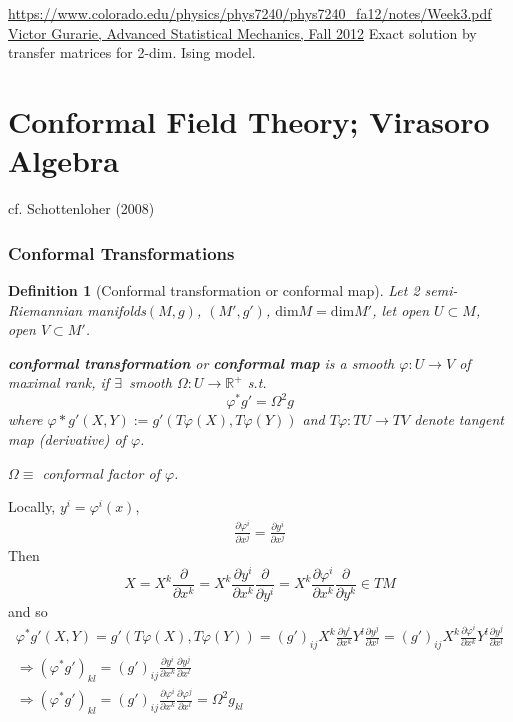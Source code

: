\documentclass[10pt]{amsart}
\newtheorem{definition}{Definition}
\begin{document}
\begin{multicols*}{2}
\url{https://www.colorado.edu/physics/phys7240/phys7240_fa12/notes/Week3.pdf}
\href{https://www.colorado.edu/physics/phys7240/phys7240_fa12/notes/Week3.pdf}{Victor Gurarie, Advanced Statistical Mechanics, Fall 2012}
Exact solution by transfer matrices for 2-dim. Ising model.  


\part{Conformal Field Theory; Virasoro Algebra}  

cf.  Schottenloher (2008)  \cite{Scho2008}

\section{Conformal Transformations}

\begin{definition}[Conformal transformation or conformal map]
Let 2 semi-Riemannian manifolds$(M,g)$, $(M',g')$, $\text{dim}M = \text{dim}M'$, let open $U\subset M$, open $V\subset M'$.  

\textbf{conformal transformation} or \textbf{conformal map} is a smooth $\varphi : U\to V$ of maximal rank, if $\exists \, $ smooth $\Omega : U\to \mathbb{R}^+$ s.t. 
\begin{equation}
	\varphi^* g' = \Omega^2 g
\end{equation}
where $\varphi* g'(X,Y) :=g'(T\varphi(X), T\varphi(Y))$ and $T\varphi: TU \to TV$ denote tangent map (derivative) of $\varphi$.  

$\Omega \equiv $ \emph{conformal factor} of $\varphi$.  
\end{definition}

Locally, $y^i = \varphi^i(x)$, \[
\begin{gathered}
	\frac{ \partial \varphi^i }{ \partial x^j} = \frac{ \partial y^i }{ \partial x^j}
\end{gathered}	
\]
Then
\[
X = X^k \frac{ \partial }{ \partial x^k} = X^k \frac{ \partial y^i }{ \partial x^k} \frac{ \partial }{ \partial y^i } = X^k \frac{ \partial \varphi^i }{ \partial x^k} \frac{ \partial }{ \partial y^k} \in TM
\]
and so 
\[
\begin{gathered}
	\varphi^* g'(X,Y) = g'(T\varphi(X), T\varphi(Y)) = (g')_{ij} X^k \frac{ \partial y^i }{ \partial x^k} Y^l \frac{ \partial y^j }{ \partial x^l} = (g')_{ij} X^k \frac{ \partial \varphi^i }{ \partial x^k } Y^l \frac{ \partial y^j}{ \partial x^l} \\ 
\Longrightarrow (\varphi^* g')_{kl} = (g')_{ij} \frac{ \partial y^i }{ \partial x^k } \frac{ \partial y^j}{ \partial x^l } \\ 
\Longrightarrow (\varphi^* g')_{kl} = (g')_{ij} \frac{ \partial \varphi^i }{ \partial x^k} \frac{ \partial \varphi^j}{ \partial x^l} = \Omega^2 g_{kl}
\end{gathered}
\]



\end{multicols*}
\end{document}

